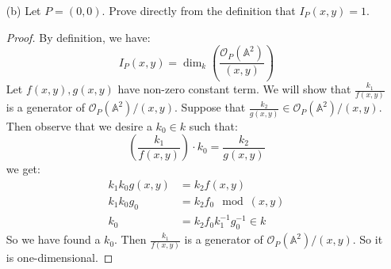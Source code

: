 \documentclass{article}
\begin{document}
\begin{itemize}
\begin{proof}
                    \begin{equation*}
                        \varphi^{*}\psi^{*}(\dfrac{g}{h}) = \dfrac{\varphi^{*}\psi^{*}(g)}{\varphi^{*}\psi^{*}(h)} = \dfrac{g}{h}
                    \end{equation*}
                since $\varphi^{*}\psi^{*} = id_{\Gamma(X)}$. Now because $\psi^{*}\varphi^{*} = id_{\Gamma(Y)}$, we have:
                    \begin{equation*}
                        \psi^{*}\varphi^{*}(\dfrac{g}{h}) = \dfrac{\psi^{*}\varphi^{*}(g)}{\psi^{*}\varphi^{*}(h)} = \dfrac{g}{h}
                    \end{equation*}
                So both compositions are identities. So $\varphi^{*}$ is an isomorphism.
            \end{proof}

        \item [(b)] Let $P = (0, 0)$. Prove directly from the definition that $I_{P}(x, y) = 1$.
            \begin{proof}
                By definition, we have:
                    \begin{equation*}
                        I_{P}(x, y) = \dim_{k}\left(\dfrac{\mathcal{O}_{P}(\mathbb{A}^{2})}{(x, y)}\right)
                    \end{equation*}
                Let $f(x, y), g(x, y)$ have non-zero constant term. We will show that $\frac{k_{1}}{f(x, y)}$ is a generator of $\mathcal{O}_{P}(\mathbb{A}^{2})/(x, y)$. Suppose that $\frac{k_{2}}{g(x, y)} \in \mathcal{O}_{P}(\mathbb{A}^{2})/(x, y)$. Then observe that we desire a $k_{0} \in k$ such that:
                    \begin{equation*}
                        \left(\dfrac{k_{1}}{f(x, y)}\right) \cdot k_{0} = \dfrac{k_{2}}{g(x, y)}
                    \end{equation*}
                we get:
                    \begin{align*}
                        k_{1}k_{0}g(x, y) &= k_{2}f(x, y)                   \\
                        k_{1}k_{0}g_{0}   &= k_{2}f_{0} \mod{(x, y)}                    \\
                        k_{0}             &= k_{2}f_{0}k_{1}^{-1}g_{0}^{-1} \in k  
                    \end{align*}
                So we have found a $k_{0}$. Then $\frac{k_{1}}{f(x, y)}$ is a generator of $\mathcal{O}_{P}(\mathbb{A}^{2})/(x, y)$. So it is one-dimensional.
            \end{proof}


\end{itemize}
\end{document}
